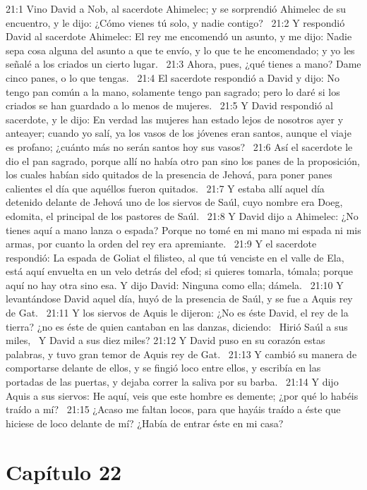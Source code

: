 21:1 Vino David a Nob, al sacerdote Ahimelec; y se sorprendió Ahimelec de su encuentro, y le dijo: ¿Cómo vienes tú solo, y nadie contigo?  
21:2 Y respondió David al sacerdote Ahimelec: El rey me encomendó un asunto, y me dijo: Nadie sepa cosa alguna del asunto a que te envío, y lo que te he encomendado; y yo les señalé a los criados un cierto lugar.  
21:3 Ahora, pues, ¿qué tienes a mano? Dame cinco panes, o lo que tengas.  
21:4 El sacerdote respondió a David y dijo: No tengo pan común a la mano, solamente tengo pan sagrado; pero lo daré si los criados se han guardado a lo menos de mujeres.  
21:5 Y David respondió al sacerdote, y le dijo: En verdad las mujeres han estado lejos de nosotros ayer y anteayer; cuando yo salí, ya los vasos de los jóvenes eran santos, aunque el viaje es profano; ¿cuánto más no serán santos hoy sus vasos?  
21:6 Así el sacerdote le dio el pan sagrado, porque allí no había otro pan sino los panes de la proposición, los cuales habían sido quitados de la presencia de Jehová, para poner panes calientes el día que aquéllos fueron quitados.  
21:7 Y estaba allí aquel día detenido delante de Jehová uno de los siervos de Saúl, cuyo nombre era Doeg, edomita, el principal de los pastores de Saúl.  
21:8 Y David dijo a Ahimelec: ¿No tienes aquí a mano lanza o espada? Porque no tomé en mi mano mi espada ni mis armas, por cuanto la orden del rey era apremiante.  
21:9 Y el sacerdote respondió: La espada de Goliat el filisteo, al que tú venciste en el valle de Ela, está aquí envuelta en un velo detrás del efod; si quieres tomarla, tómala; porque aquí no hay otra sino esa. Y dijo David: Ninguna como ella; dámela.  
21:10 Y levantándose David aquel día, huyó de la presencia de Saúl, y se fue a Aquis rey de Gat.  
21:11 Y los siervos de Aquis le dijeron: ¿No es éste David, el rey de la tierra? ¿no es éste de quien cantaban en las danzas, diciendo:  
Hirió Saúl a sus miles,  
Y David a sus diez miles? 
21:12 Y David puso en su corazón estas palabras, y tuvo gran temor de Aquis rey de Gat.  
21:13 Y cambió su manera de comportarse delante de ellos, y se fingió loco entre ellos, y escribía en las portadas de las puertas, y dejaba correr la saliva por su barba.  
21:14 Y dijo Aquis a sus siervos: He aquí, veis que este hombre es demente; ¿por qué lo habéis traído a mí?  
21:15 ¿Acaso me faltan locos, para que hayáis traído a éste que hiciese de loco delante de mí? ¿Había de entrar éste en mi casa?  
\section*{Capítulo 22 }

